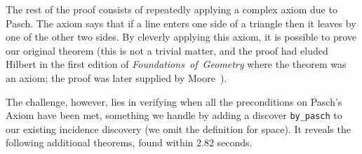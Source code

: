 \vspace{0.2cm}
\noindent{}
\vspace{0.1cm}

The rest of the proof consists of repeatedly applying a complex axiom due to Pasch. The axiom says that if a line enters one side of a triangle then it leaves by one of the other two sides. By cleverly applying this axiom, it is possible to prove our original theorem (this is not a trivial matter, and the proof had eluded Hilbert in the first edition of \emph{Foundations~of~Geometry} where the theorem was an axiom; the proof was later supplied by Moore~\cite{MooreProof}). 

The challenge, however, lies in verifying when all the preconditions on Pasch's Axiom have been met, something we handle by adding a discover \texttt{by\_pasch} to our existing incidence discovery (we omit the definition for space). It reveals the following additional theorems, found within 2.82 seconds.

\vspace{0.2cm}
\noindent{}
\vspace{0.1cm}

